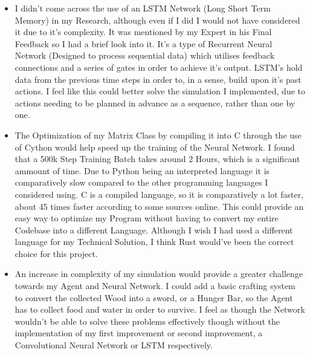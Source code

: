 \begin{flushleft}
\begin{itemize}
            \vspace{0.2cm}
            \item I didn't come across the use of an LSTM Network (Long Short Term Memory) in my Research, although even if I did I would not have considered
            it due to it's complexity. It was mentioned by my Expert in his Final Feedback so I had a brief look into it. It's a type of Recurrent Neural Network 
            (Designed to process sequential data) which utilises feedback connections and a series of gates in order to achieve it's output. LSTM's hold 
            data from the previous time steps in order to, in a sense, build upon it's past actions. I feel like this could better solve the simulation 
            I implemented, due to actions needing to be planned in advance as a sequence, rather than one by one.
            
            \vspace{0.2cm}
            \item The Optimization of my Matrix Class by compiling it into C through the use of Cython would help speed up the training of the Neural
            Network. I found that a 500k Step Training Batch takes around 2 Hours, which is a significant ammount of time. Due to Python being an interpreted language 
            it is comparatively slow compared to the other programming languages I considered using. C is a compiled language, so it is comparatively a 
            lot faster, about 45 times faster according to some sources online. This could
            provide an easy way to optimize my Program without having to convert my entire Codebase into a different Language. Although I wish I
            had used a different language for my Technical Solution, I think Rust would've been the correct choice for this project. \\

            \vspace{0.2cm}
            \item An increase in complexity of my simulation would provide a greater challenge towards my Agent and Neural Network. I could add a basic
            crafting system to convert the collected Wood into a sword, or a Hunger Bar, so the Agent has to collect food and water in order to survive.
            I feel as though the Network wouldn't be able to solve these problems effectively though without the implementation of my first improvement
            or second improvement, a Convolutional Neural Network or LSTM respectively. \\

            \vspace{0.2cm}
        \end{itemize}
\end{flushleft}